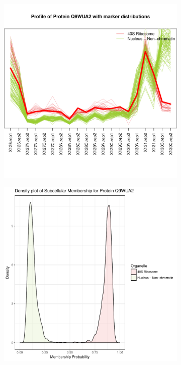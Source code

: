 \documentclass[12pt,english]{article}\usepackage[]{graphicx}\usepackage[]{color}
\makeatletter
\def\maxwidth{ %
  \ifdim\Gin@nat@width>\linewidth
    \linewidth
  \else
    \Gin@nat@width
  \fi
}
\newenvironment{knitrout}{}{} %
\makeatother
\begin{document}
\begin{figure}[h]
\begin{subfigure}[t]{0.5\textwidth}
\begin{knitrout}
{\centering \includegraphics[width=\maxwidth]{figure/unnamed-chunk-17-1} 

}



\end{knitrout}
    \caption{}
  \end{subfigure}
  \vspace{1cm}
  \begin{subfigure}[t]{0.5\textwidth}
    \centering
\begin{knitrout}
\color{fgcolor}

{\centering \includegraphics[width=\maxwidth]{figure/unnamed-chunk-18-1} 

}
\end{knitrout}
\end{subfigure}
\end{figure}
\end{document}
